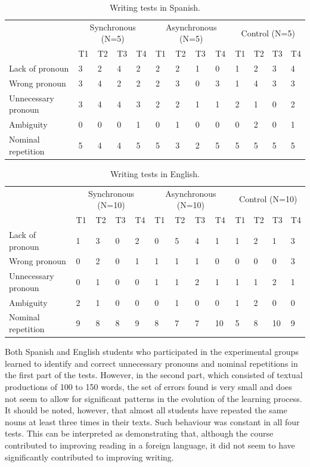 \documentclass{textolivre}
\begin{document}
\begin{table}[htpb]
\caption{Writing tests in Spanish.}
\label{tbl07}
\small
\centering
\begin{tabular}{lllllllllllll}
\toprule
 & \multicolumn{4}{c}{Synchronous (N=5)} & \multicolumn{4}{c}{Asynchronous (N=5)} & \multicolumn{4}{c}{Control (N=5)} \\
 & T1 & T2 & T3 & T4 & T1 & T2 & T3 & T4 & T1 & T2 & T3 & T4 \\
Lack of pronoun & 3 & 2 & 4 & 2 & 2 & 2 & 1 & 0 & 1 & 2 & 3 & 4 \\
Wrong pronoun & 3 & 4 & 2 & 2 & 2 & 3 & 0 & 3 & 1 & 4 & 3 & 3 \\
Unnecessary pronoun & 3 & 4 & 4 & 3 & 2 & 2 & 1 & 1 & 2 & 1 & 0 & 2 \\
Ambiguity & 0 & 0 & 0 & 1 & 0 & 1 & 0 & 0 & 0 & 2 & 0 & 1 \\
Nominal repetition & 5 & 4 & 4 & 5 & 5 & 3 & 2 & 5 & 5 & 5 & 5 & 5 \\
\bottomrule
\end{tabular}
\end{table}


\begin{table}[htpb]
\caption{Writing tests in English.}
\label{tbl08}
\small
\centering
\begin{tabular}{lllllllllllll}
\toprule
 & \multicolumn{4}{c}{Synchronous (N=10)} & \multicolumn{4}{c}{Asynchronous (N=10)} & \multicolumn{4}{c}{Control (N=10)} \\ 
 & T1 & T2 & T3 & T4 & T1 & T2 & T3 & T4 & T1 & T2 & T3 & T4 \\ 
Lack of pronoun & 1 & 3 & 0 & 2 & 0 & 5 & 4 & 1 & 1 & 2 & 1 & 3 \\
Wrong pronoun & 0 & 2 & 0 & 1 & 1 & 1 & 1 & 0 & 0 & 0 & 0 & 3 \\
Unnecessary pronoun & 0 & 1 & 0 & 0 & 1 & 1 & 2 & 1 & 1 & 1 & 2 & 1 \\ 
Ambiguity & 2 & 1 & 0 & 0 & 0 & 1 & 0 & 0 & 1 & 2 & 0 & 0 \\
Nominal repetition & 9 & 8 & 8 & 9 & 8 & 7 & 7 & 10 & 5 & 8 & 10 & 9 \\
\bottomrule
\end{tabular}
\end{table}


Both Spanish and English students who participated in the experimental
groups learned to identify and correct unnecessary pronouns and nominal
repetitions in the first part of the tests. However, in the second part,
which consisted of textual productions of 100 to 150 words, the set of
errors found is very small and does not seem to allow for significant
patterns in the evolution of the learning process. It should be noted,
however, that almost all students have repeated the same nouns at least
three times in their texts. Such behaviour was constant in all four
tests. This can be interpreted as demonstrating that, although the
course contributed to improving reading in a foreign language, it did
not seem to have significantly contributed to improving writing.
\end{document}

